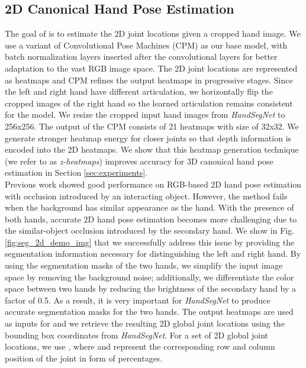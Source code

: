 \documentclass[10pt,twocolumn,letterpaper]{article}
\begin{document}
\subsection{2D Canonical Hand Pose Estimation}\label{sec:2D}
\indent The goal of \textit{} is to estimate the 2D joint locations given a cropped hand image. We use a variant of Convolutional Pose Machines (CPM) \cite{Wei} as our base model, with batch normalization layers inserted after the convolutional layers for better adaptation to the vast RGB image space. The 2D joint locations are represented as heatmaps and CPM refines the output heatmaps in progressive stages. Since the left and right hand have different articulation, we horizontally flip the cropped images of the right hand so the learned articulation remains consistent for the model. We resize the cropped input hand images from \textit{HandSegNet} to 256x256. The output of the CPM consists of 21 heatmaps with size of 32x32. We generate stronger heatmap energy for closer joints so that depth information is encoded into the 2D heatmaps. We show that this heatmap generation technique (we refer to as \textit{z-heatmaps}) improves accuracy for 3D canonical hand pose estimation in Section \ref{sec:experiments}.\\
\indent Previous work \cite{Mueller} showed good performance on RGB-based 2D hand pose estimation with occlusion introduced by an interacting object. However, the method fails when the background has similar appearance as the hand. With the presence of both hands, accurate 2D hand pose estimation becomes more challenging due to the similar-object occlusion introduced by the secondary hand. We show in Fig. \ref{fig:seg_2d_demo_img} that we successfully address this issue by providing the segmentation information necessary for distinguishing the left and right hand. By using the segmentation masks of the two hands, we simplify the input image space by removing the background noise; additionally, we differentiate the color space between two hands by reducing the brightness of the secondary hand by a factor of 0.5. As a result, it is very important for \textit{HandSegNet} to produce accurate segmentation masks for the two hands. The output heatmaps are used as inputs for \textit{} and we retrieve the resulting 2D global joint locations using the bounding box coordinates from \textit{HandSegNet}. For a set of 2D global joint locations, we use , where  and  represent the corresponding row and column position of the  joint in form of percentages.
\end{document}
